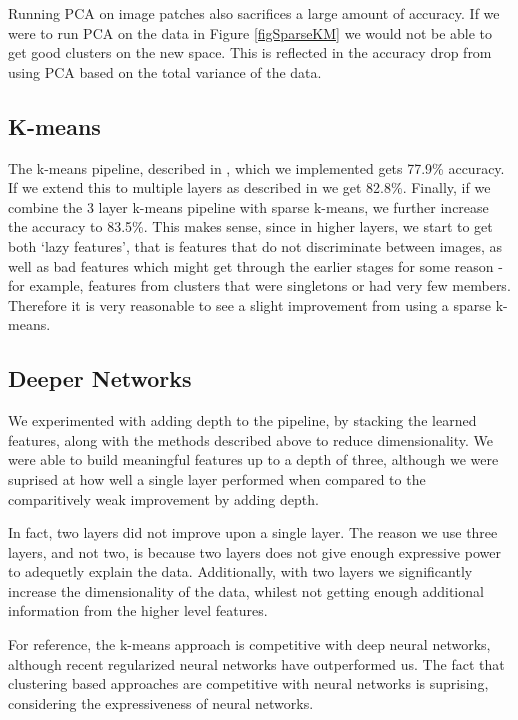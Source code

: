 \documentclass{article} %
\begin{document}
Running PCA on image patches also sacrifices a large amount of accuracy. If we were to run PCA on the data in Figure \ref{figSparseKM} we would not be able to get good clusters on the new space. This is reflected in the accuracy drop from using PCA based on the total variance of the data.

\subsection{K-means}

The k-means pipeline, described in \cite{coates11}, which we implemented gets 77.9\% accuracy. If we extend this to multiple layers as described in \cite{coates} we get 82.8\%. Finally, if we combine the 3 layer k-means pipeline with sparse k-means, we further increase the accuracy to 83.5\%. This makes sense, since in higher layers, we start to get both `lazy features', that is features that do not discriminate between images, as well as bad features which might get through the earlier stages for some reason - for example, features from clusters that were singletons or had very few members. Therefore it is very reasonable to see a slight improvement from using a sparse k-means.

\subsection{Deeper Networks}

We experimented with adding depth to the pipeline, by stacking the learned features, along with the methods described above to reduce dimensionality. We were able to build meaningful features up to a depth of three, although we were suprised at how well a single layer performed when compared to the comparitively weak improvement by adding depth.

In fact, two layers did not improve upon a single layer. The reason we use three layers, and not two, is because two layers does not give enough expressive power to adequetly explain the data. Additionally, with two layers we significantly increase the dimensionality of the data, whilest not getting enough additional information from the higher level features.

For reference, the k-means approach is competitive with deep neural networks, although recent regularized neural networks have outperformed us. The fact that clustering based approaches are competitive with neural networks is suprising, considering the expressiveness of neural networks.
\end{document}
